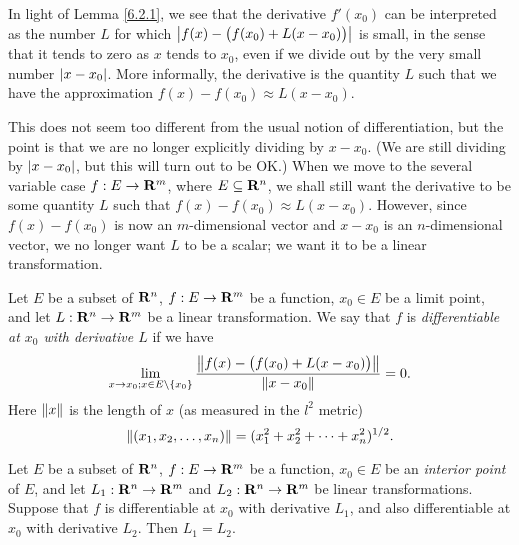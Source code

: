 \begin{note}
    In light of Lemma \ref{6.2.1}, we see that the derivative \(f'(x_0)\) can be interpreted as the number \(L\) for which \(\abs{f(x) - \big(f(x_0) + L(x - x_0)\big)}\) is small, in the sense that it tends to zero as \(x\) tends to \(x_0\), even if we divide out by the very small number \(\abs{x - x_0}\).
    More informally, the derivative is the quantity \(L\) such that we have the approximation \(f(x) - f(x_0) \approx L(x - x_0)\).

    This does not seem too different from the usual notion of differentiation, but the point is that we are no longer explicitly dividing by \(x - x_0\).
    (We are still dividing by \(\abs{x - x_0}\), but this will turn out to be OK.)
    When we move to the several variable case \(f : E \to \R^m\), where \(E \subseteq \R^n\), we shall still want the derivative to be some quantity \(L\) such that \(f(x) - f(x_0) \approx L(x - x_0)\).
    However, since \(f(x) - f(x_0)\) is now an \(m\)-dimensional vector and \(x - x_0\) is an \(n\)-dimensional vector, we no longer want \(L\) to be a scalar;
    we want it to be a linear transformation.
\end{note}

\begin{definition}[Differentiability]\label{6.2.2}
    Let \(E\) be a subset of \(\R^n\), \(f : E \to \R^m\) be a function, \(x_0 \in E\) be a limit point, and let \(L : \R^n \to \R^m\) be a linear transformation.
    We say that \(f\) is \emph{differentiable at \(x_0\) with derivative \(L\)} if we have
    \[
        \lim_{x \to x_0 ; x \in E \setminus \{x_0\}} \frac{\norm*{f(x) - \big(f(x_0) + L(x - x_0)\big)}}{\norm*{x - x_0}} = 0.
    \]
    Here \(\norm*{x}\) is the length of \(x\) (as measured in the \(l^2\) metric)
    \[
        \norm*{(x_1, x_2, \dots, x_n)} = (x_1^2 + x_2^2 + \dots + x_n^2)^{1 / 2}.
    \]
\end{definition}

\setcounter{theorem}{3}
\begin{lemma}\label{6.2.4}
    Let \(E\) be a subset of \(\R^n\), \(f : E \to \R^m\) be a function, \(x_0 \in E\) be an \emph{interior point} of \(E\), and let \(L_1 : \R^n \to \R^m\) and \(L_2 : \R^n \to \R^m\) be linear transformations.
    Suppose that \(f\) is differentiable at \(x_0\) with derivative \(L_1\), and also differentiable at \(x_0\) with derivative \(L_2\).
    Then \(L_1 = L_2\).
\end{lemma}

